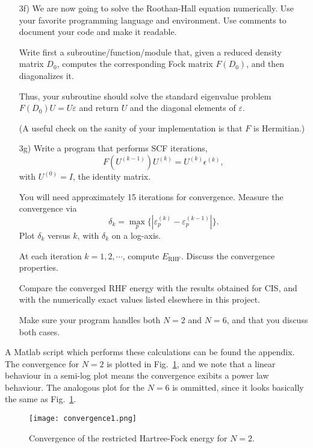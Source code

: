 \documentclass[a4paper]{article}
\newcommand{\fig}[1]{Fig.\ \ref{fig:#1}}
\begin{document}
\begin{exframe}
\begin{itemize}
  \item[3f)] We are now going to solve the Roothan-Hall equation numerically. Use your favorite programming language and environment. Use comments to document your code and make it readable.

  Write first a subroutine/function/module that, given a reduced
  density matrix $D_0$, computes the corresponding Fock matrix
  $F(D_0)$, and then diagonalizes it.

  Thus, your subroutine should solve the standard eigenvalue problem
  $F(D_0)U = U\varepsilon$ and return $U$ and the diagonal elements of
  $\varepsilon$.

  (A useful check on the sanity of your implementation is that $F$ is
  Hermitian.)
\end{itemize}
\end{exframe}
\begin{exframe}
\begin{itemize}
  \item[3g)] Write a program that performs SCF iterations,
  \begin{equation}
    F(U^{(k-1)}) U^{(k)} = U^{(k)}\epsilon^{(k)},
  \end{equation}
  with $U^{(0)}=I$, the identity matrix.

  You will need approximately 15 iterations for convergence. Measure
  the convergence via
  \begin{equation}
    \delta_k = \max_p\{|\varepsilon^{(k)}_p - \varepsilon^{(k-1)}_p|\}.
  \end{equation}
  Plot $\delta_k$ versus $k$, with $\delta_k$ on a log-axis.
  
  At each iteration $k=1,2,\cdots$, compute $E_\text{RHF}$. Discuss the
  convergence properties.

  Compare the converged RHF energy with the results obtained for CIS,
  and with the numerically exact values listed elsewhere in this project.

  Make sure your program handles both $N=2$ and $N=6$, and that you
  discuss both cases.
\end{itemize}
\end{exframe}
A {\sc Matlab} script which performs these calculations can be found the appendix. The convergence for $N=2$ is plotted in \fig{1}, and we note that a linear behaviour in a semi-log plot means the convergence exibits a power law behaviour. The analogous plot for the $N=6$ is ommitted, since it looks basically the same as \fig{1}.
\begin{figure}[h]
\centering
\texttt{[image: convergence1.png]}
\caption{Convergence of the restricted Hartree-Fock energy for $N=2$. \label{fig:1}}
\end{figure}
\end{document}
